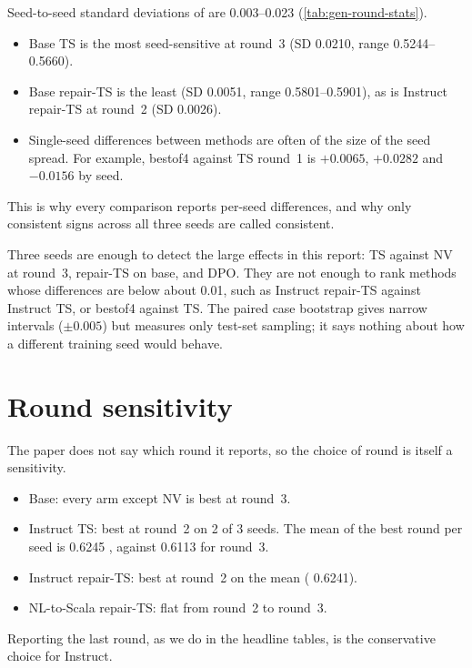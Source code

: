 \begin{observation}
Seed-to-seed standard deviations of \Mviii{} are 0.003--0.023 (\cref{tab:gen-round-stats}).
\begin{itemize}
\item Base TS is the most seed-sensitive at round~3 (SD 0.0210, range 0.5244--0.5660).
\item Base repair-TS is the least (SD 0.0051, range 0.5801--0.5901), as is Instruct repair-TS at round~2 (SD 0.0026).
\item Single-seed differences between methods are often of the size of the seed spread. For example, bestof4 against
TS round~1 is $+0.0065$, $+0.0282$ and $-0.0156$ by seed.
\end{itemize}
This is why every comparison reports per-seed differences, and why only consistent signs across all three seeds are
called consistent.
\end{observation}

\begin{interpretation}
Three seeds are enough to detect the large effects in this report: TS against NV at round~3, repair-TS on base, and
DPO. They are not enough to rank methods whose differences are below about 0.01, such as Instruct repair-TS against
Instruct TS, or bestof4 against TS. The paired case bootstrap gives narrow intervals ($\pm0.005$) but measures only
test-set sampling; it says nothing about how a different training seed would behave.
\end{interpretation}

\section{Round sensitivity}

The paper does not say which round it reports, so the choice of round is itself a sensitivity.
\begin{itemize}
\item Base: every arm except NV is best at round~3.
\item Instruct TS: best at round~2 on 2 of 3 seeds. The mean of the best round per seed is 0.6245 \ZSiv{}, against
0.6113 for round~3.
\item Instruct repair-TS: best at round~2 on the mean (\ZSiv{} 0.6241).
\item NL-to-Scala repair-TS: flat from round~2 to round~3.
\end{itemize}
Reporting the last round, as we do in the headline tables, is the conservative choice for Instruct.

